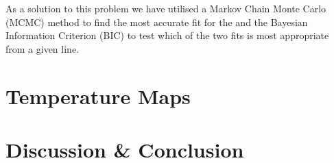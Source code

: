 \documentclass{emulateapj}
\begin{document}
As a solution to this problem we have utilised a Markov Chain Monte Carlo (MCMC) method to find the most accurate fit for the  and the Bayesian Information Criterion (BIC) to test which of the two fits is most appropriate from a given line.




\section{Temperature Maps}
\label{temp_map_sect}







\section{Discussion \& Conclusion}





\end{document}
